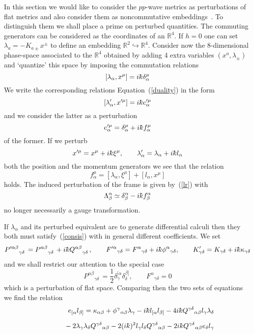 \documentclass[12pt,a4paper]{article}
\newcounter{eg}
\def\b#1{{\mathbb #1}}
\def\kbar{{\mathchar'26\mkern-9muk}}
\begin{document}
In this section we would like to consider the $pp$-wave metrics as
perturbations of flat metrics and also consider them as noncommutative
embeddings~\cite{MadMou98,GraLizMarVit01}. To distinguish them we
shall place a prime on perturbed quantities.
The commuting generators can be considered as the coordinates of an
$\b{R}^4$. If $h=0$ one can set $\lambda_a = - K_{a\pm} x^\pm$ to
define an embedding $\b{R}^2 \hookrightarrow \b{R}^4$. Consider now
the 8-dimensional phase-space associated to the $\b{R}^4$ obtained by
adding 4 extra variables $(x^{a}, \lambda_\pm)$ and `quantize' this
space by imposing the commutation relations
$$
[\lambda_\alpha, x^\mu] = i \kbar \delta_\alpha^\mu
$$
We write the corresponding relations Equation~(\ref{duality}) in the
form
$$
[\lambda^\prime_\alpha, x^{\prime\mu}] = i \kbar e_\alpha^{\prime\mu}
$$
and we consider the latter as a perturbation
$$
e_\alpha^{\prime\mu} = \delta_\alpha^\mu + i\kbar f_\alpha^{\mu}
$$
of the former. If we perturb 
$$
x^{\prime\mu} = x^\mu + i\kbar \xi^\mu, \qquad 
\lambda^\prime_\alpha = \lambda_\alpha + i\kbar l_\alpha 
$$
both the position and the momentum generators we see that the relation 
$$
f^{\mu}_\alpha = [\lambda_\alpha, \xi^\mu] + [l_\alpha, x^\mu]
$$
holds. The induced perturbation of the frame is given by~(\ref{lr}) with
$$
\Lambda^\alpha_\beta \simeq \delta^\alpha_\beta - i\kbar f^\alpha_\beta
$$
no longer necessarily a gauge transformation.

If $\lambda_\alpha$ and its perturbed equivalent are to generate
differential calculi then they both must satisfy~(\ref{consis}) with
in general different coefficients. We set
$$
P^{\prime\alpha\beta}{}^{\phantom{\alpha\beta}}_{\gamma\delta} = 
P^{\alpha\beta}{}^{\phantom{\alpha\beta}}_{\gamma\delta} +
i\kbar Q^{\alpha\beta}{}^{\phantom{\alpha\beta}}_{\gamma\delta},
\qquad
F^{\prime\alpha}{}_{\gamma\delta} = F^{\alpha}{}_{\gamma\delta}
 + i\kbar \phi^{\alpha}{}_{\gamma\delta}, \qquad
K^\prime_{\gamma\delta} = K_{\gamma\delta} +i\kbar  \kappa_{\gamma\delta}
$$
and we shall restrict our attention to the special case
$$
P^{\alpha\beta}{}^{\phantom{\alpha\beta}}_{\gamma\delta} =
\frac 12 \delta^{[\alpha}_\gamma \delta^{\beta]}_\delta, \qquad
F^{\alpha}{}_{\gamma\delta} = 0
$$
which is a perturbation of flat space. Comparing then the two sets of
equations we find the relation
\begin{eqnarray*}
&&e_{[\alpha} l_{\beta]} =  \kappa_{\alpha\beta} +
\phi^{\gamma}{}_{\alpha\beta}\lambda_\gamma
- i\kbar l_{[\alpha} l_{\beta]}
- 4 i\kbar Q^{\gamma\delta}{}_{\alpha\beta} 
l_{\gamma} \lambda_{\delta} \\[6pt]
&&\phantom{e_{[\alpha} l_{\beta]}}
-2 \lambda_\gamma\lambda_\delta Q^{\gamma\delta}{}_{\alpha\beta}  
-2 (i\kbar)^2 l_\gamma l_\delta Q^{\gamma\delta}{}_{\alpha\beta}
-2 i\kbar Q^{\gamma\delta}{}_{\alpha\beta} e_{\delta} l_{\gamma} 
\end{eqnarray*}
\end{document}
